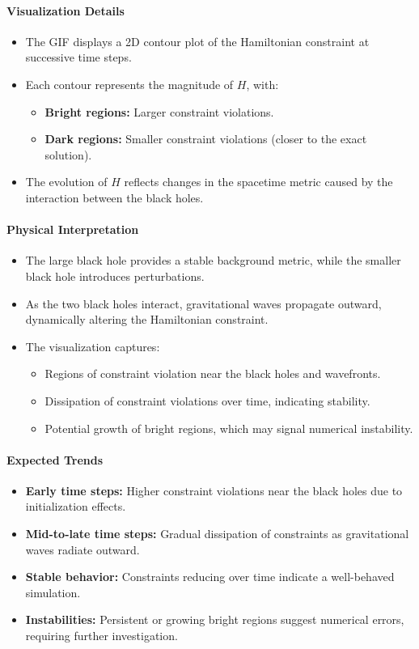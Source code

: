 \documentclass[12pt]{article}
\begin{document}
\paragraph{Visualization Details}
\begin{itemize}
    \item The GIF displays a 2D contour plot of the Hamiltonian constraint at successive time steps.
    \item Each contour represents the magnitude of \( H \), with:
    \begin{itemize}
        \item \textbf{Bright regions:} Larger constraint violations.
        \item \textbf{Dark regions:} Smaller constraint violations (closer to the exact solution).
    \end{itemize}
    \item The evolution of \( H \) reflects changes in the spacetime metric caused by the interaction between the black holes.
\end{itemize}

\paragraph{Physical Interpretation}
\begin{itemize}
    \item The large black hole provides a stable background metric, while the smaller black hole introduces perturbations.
    \item As the two black holes interact, gravitational waves propagate outward, dynamically altering the Hamiltonian constraint.
    \item The visualization captures:
    \begin{itemize}
        \item Regions of constraint violation near the black holes and wavefronts.
        \item Dissipation of constraint violations over time, indicating stability.
        \item Potential growth of bright regions, which may signal numerical instability.
    \end{itemize}
\end{itemize}

\paragraph{Expected Trends}
\begin{itemize}
    \item \textbf{Early time steps:} Higher constraint violations near the black holes due to initialization effects.
    \item \textbf{Mid-to-late time steps:} Gradual dissipation of constraints as gravitational waves radiate outward.
    \item \textbf{Stable behavior:} Constraints reducing over time indicate a well-behaved simulation.
    \item \textbf{Instabilities:} Persistent or growing bright regions suggest numerical errors, requiring further investigation.
\end{itemize}
\end{document}
